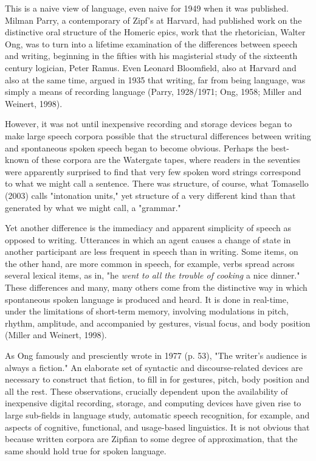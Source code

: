 \documentclass[12pt]{article}
\begin{document}
This is a naive view of language, even naive for 1949 when it was published.  Milman Parry, a contemporary of Zipf's at Harvard, had published work on the distinctive oral structure of the Homeric epics, work that the rhetorician, Walter Ong, was to turn into a lifetime examination of the differences between speech and writing, beginning in the fifties with his magisterial study of the sixteenth century logician, Peter Ramus.   Even Leonard Bloomfield, also at Harvard and also at the same time, argued in 1935 that writing, far from being language, was simply a means of recording language (Parry, 1928/1971; Ong, 1958; Miller and Weinert, 1998).  

However, it was not until inexpensive recording and storage devices began to make large speech corpora possible that the structural differences between writing and spontaneous spoken speech began to become obvious.   Perhaps the best-known of these corpora are the Watergate tapes, where readers in the seventies were apparently surprised to find that very few spoken word strings correspond to what we might call a sentence.  There was structure, of course, what Tomasello (2003) calls "intonation units," yet structure of a very different kind than that generated by what we might call, a "grammar."  

Yet another difference is the immediacy and apparent simplicity of speech as opposed to writing.   Utterances in which an agent causes a change of state in another participant are less frequent in speech than in writing.  Some items, on the other hand, are more common in speech, for example, verbs spread across several lexical items, as in, "he \emph{went to all the trouble of cooking} a nice dinner." These differences and many, many others come from the distinctive way in which spontaneous spoken language is produced and heard. It is done in real-time, under the limitations of short-term memory, involving modulations in pitch, rhythm, amplitude, and accompanied by gestures, visual focus, and body position (Miller and Weinert, 1998).  

As Ong famously and presciently wrote in 1977 (p. 53), "The writer's audience is always a fiction." An elaborate set of syntactic and discourse-related devices are necessary to construct that fiction, to fill in for gestures, pitch, body position and all the rest.  These observations, crucially dependent upon the availability of inexpensive digital recording, storage, and computing devices have given rise to large sub-fields in language study, automatic speech recognition, for example, and aspects of cognitive, functional, and usage-based linguistics. It is not obvious that because written corpora are Zipfian to some degree of approximation, that the same should hold true for spoken language.
\end{document}
